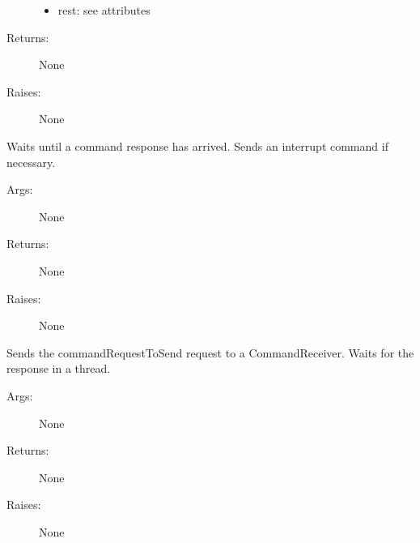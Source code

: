 \documentclass[letterpaper,10pt,english]{sphinxmanual}
\begin{document}
\begin{fulllineitems}
\begin{fulllineitems}
\begin{description}
\begin{itemize}
\item {} 
rest: see attributes

\end{itemize}

\item[{Returns:}] \leavevmode
None

\item[{Raises:}] \leavevmode
None

\end{description}

\end{fulllineitems}


\begin{fulllineitems}
\label{communicationUtilities:communicationUtilities.CommandSender.receiveResponse}
Waits until a command response has arrived. Sends an interrupt command if necessary.
\begin{description}
\item[{Args:}] \leavevmode
None

\item[{Returns:}] \leavevmode
None

\item[{Raises:}] \leavevmode
None

\end{description}

\end{fulllineitems}


\begin{fulllineitems}
\label{communicationUtilities:communicationUtilities.CommandSender.run}
\end{fulllineitems}


\begin{fulllineitems}
\label{communicationUtilities:communicationUtilities.CommandSender.sendRequest}
Sends the commandRequestToSend request to a CommandReceiver. Waits for the response in a thread.
\begin{description}
\item[{Args:}] \leavevmode
None

\item[{Returns:}] \leavevmode
None

\item[{Raises:}] \leavevmode
None

\end{description}

\end{fulllineitems}


\end{fulllineitems}
\end{document}
